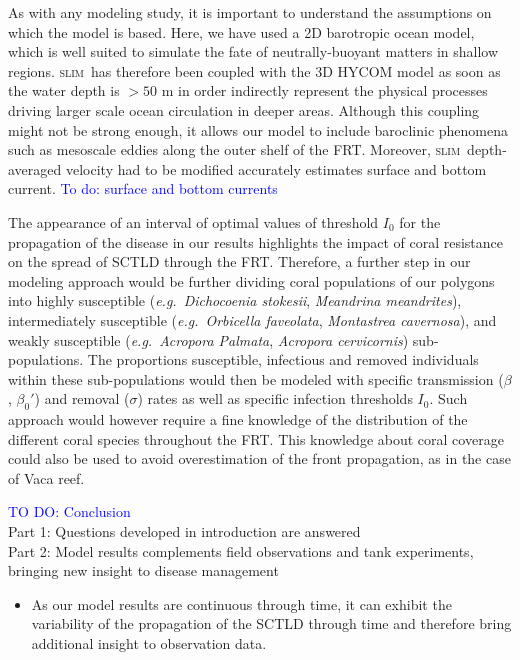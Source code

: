\documentclass[utf8]{frontiersSCNS}
\newcommand{\slim}{\textsc{slim}\ }
\newcommand{\eg}{{\it e.g.}\ }
\begin{document}
As with any modeling study, it is important to understand the assumptions on which the model is based. Here, we have used a 2D barotropic ocean model, which is well suited to simulate the fate of neutrally-buoyant matters in shallow regions. \slim has therefore been coupled with the 3D HYCOM model as soon as the water depth is $>50$ m in order indirectly represent the physical processes driving larger scale ocean circulation in deeper areas. Although this coupling might not be strong enough, it allows our model to include baroclinic phenomena such as mesoscale eddies along the outer shelf of the FRT. Moreover, \slim depth-averaged velocity had to be modified accurately estimates surface and bottom current.  \textcolor{blue}{To do: surface and bottom currents}

The appearance of an interval of optimal values of threshold $I_0$ for the propagation of the disease in our results highlights the impact of coral resistance on the spread of SCTLD through the FRT. Therefore, a further step in our modeling approach would be further dividing coral populations of our polygons into highly susceptible (\eg \textit{Dichocoenia stokesii}, \textit{Meandrina meandrites}), intermediately susceptible (\eg \textit{Orbicella faveolata}, \textit{Montastrea cavernosa}), and weakly susceptible (\eg \textit{Acropora Palmata}, \textit{Acropora cervicornis}) sub-populations. The proportions susceptible, infectious and removed individuals within these sub-populations would then be modeled with specific transmission ($\beta$, $\beta_0'$) and removal ($\sigma$) rates as well as specific infection thresholds $I_0$. Such approach would however require a fine knowledge of the distribution of the different coral species throughout the FRT. This knowledge about coral coverage could also be used to avoid overestimation of the front propagation, as in the case of Vaca reef.

\textcolor{blue}{TO DO: Conclusion} \\
Part 1: Questions developed in introduction are answered\\
Part 2: Model results complements field observations and tank experiments, bringing new insight to disease management
\begin{itemize}
    \item As our model results are continuous through time, it can exhibit the variability of the propagation of the SCTLD through time and therefore bring additional insight to observation data.
\end{itemize}
\end{document}
